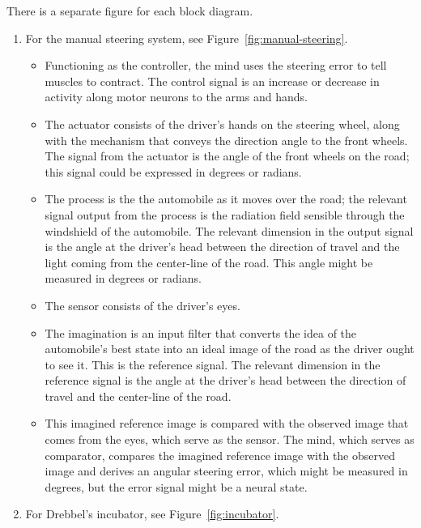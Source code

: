 There is a separate figure for each block diagram.
\begin{enumerate}
   \item For the manual steering system, see
      Figure~\ref{fig:manual-steering}.
      \begin{itemize}
         \item Functioning as the controller, the mind uses the steering error
            to tell muscles to contract. The control signal is an increase or
            decrease in activity along motor neurons to the arms and hands.
         \item The actuator consists of the driver's hands on the steering
            wheel, along with the mechanism that conveys the direction angle to
            the front wheels. The signal from the actuator is the angle of the
            front wheels on the road; this signal could be expressed in degrees
            or radians.
         \item The process is the the automobile as it moves over the road; the
            relevant signal output from the process is the radiation field
            sensible through the windshield of the automobile. The relevant
            dimension in the output signal is the angle at the driver's head
            between the direction of travel and the light coming from the
            center-line of the road. This angle might be measured in degrees or
            radians.
         \item The sensor consists of the driver's eyes.
         \item The imagination is an input filter that converts the idea of the
            automobile's best state into an ideal image of the road as the
            driver ought to see it.  This is the reference signal. The relevant
            dimension in the reference signal is the angle at the driver's head
            between the direction of travel and the center-line of the road.
         \item This imagined reference image is compared with the observed
            image that comes from the eyes, which serve as the sensor.  The
            mind, which serves as comparator, compares the imagined reference
            image with the observed image and derives an angular steering
            error, which might be measured in degrees, but the error signal
            might be a neural state.
      \end{itemize}
   \item For Drebbel's incubator, see Figure~\ref{fig:incubator}.
\end{enumerate}

